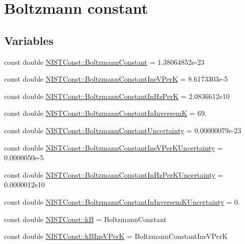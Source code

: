 \hypertarget{group___boltzmann_constant}{}\section{Boltzmann constant}
\label{group___boltzmann_constant}
\subsection*{Variables}
\begin{DoxyCompactItemize}
\item 
const double \hyperlink{group___boltzmann_constant_ga505057a2eb7e925fde668cc1025331df}{N\+I\+S\+T\+Const\+::\+Boltzmann\+Constant} = 1.\+38064852e-\/23
\item 
const double \hyperlink{group___boltzmann_constant_gad31ba56bbe6d4a0f40252ef7b48b52a3}{N\+I\+S\+T\+Const\+::\+Boltzmann\+Constant\+Ine\+V\+PerK} = 8.\+6173303e-\/5
\item 
const double \hyperlink{group___boltzmann_constant_ga5c59003e6fbd70482ee1bdaf7ea35b7a}{N\+I\+S\+T\+Const\+::\+Boltzmann\+Constant\+In\+Hz\+PerK} = 2.\+0836612e10
\item 
const double \hyperlink{group___boltzmann_constant_ga4f4d8adf824657420f54680daa6340d5}{N\+I\+S\+T\+Const\+::\+Boltzmann\+Constant\+In\+InversemK} = 69.
\item 
const double \hyperlink{group___boltzmann_constant_gaa32ac947c545e70076f0e08aceb3ce16}{N\+I\+S\+T\+Const\+::\+Boltzmann\+Constant\+Uncertainty} = 0.\+00000079e-\/23
\item 
const double \hyperlink{group___boltzmann_constant_ga6a1c42c4e69994962116d279d6f49203}{N\+I\+S\+T\+Const\+::\+Boltzmann\+Constant\+Ine\+V\+Per\+K\+Uncertainty} = 0.\+0000050e-\/5
\item 
const double \hyperlink{group___boltzmann_constant_gaa87e06f419f94e4ea1ac8dcd769537ee}{N\+I\+S\+T\+Const\+::\+Boltzmann\+Constant\+In\+Hz\+Per\+K\+Uncertainty} = 0.\+0000012e10
\item 
const double \hyperlink{group___boltzmann_constant_gadb520d4ce5d980c8ba24d9499f500873}{N\+I\+S\+T\+Const\+::\+Boltzmann\+Constant\+In\+Inversem\+K\+Uncertainty} = 0.
\item 
const double \hyperlink{group___boltzmann_constant_ga6c7ead5913113ec6e980e80f21d27fd0}{N\+I\+S\+T\+Const\+::kB} = Boltzmann\+Constant
\item 
const double \hyperlink{group___boltzmann_constant_gae6941828181b77b14f5f24a8b713570f}{N\+I\+S\+T\+Const\+::k\+B\+Ine\+V\+PerK} = Boltzmann\+Constant\+Ine\+V\+PerK

\end{DoxyCompactItemize}
